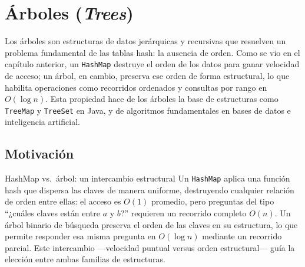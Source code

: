 %
%
%

\chapter{Árboles (\textit{Trees})}
\label{ch:trees}

Los árboles son estructuras de datos jerárquicas y recursivas que resuelven un problema
fundamental de las tablas hash: la ausencia de orden. Como se vio en el capítulo anterior,
un \texttt{HashMap} destruye el orden de los datos para ganar velocidad de acceso; un árbol,
en cambio, preserva ese orden de forma estructural, lo que habilita operaciones como
recorridos ordenados y consultas por rango en $O(\log n)$. Esta propiedad hace de los árboles
la base de estructuras como \texttt{TreeMap} y \texttt{TreeSet} en Java, y de algoritmos
fundamentales en bases de datos e inteligencia artificial.

\section{Motivación}
\label{sec:trees-motivacion}

\begin{observacion}{HashMap vs.\ árbol: un intercambio estructural}
Un \texttt{HashMap} aplica una función hash que dispersa las claves de manera uniforme,
destruyendo cualquier relación de orden entre ellas: el acceso es $O(1)$ promedio, pero
preguntas del tipo ``¿cuáles claves están entre $a$ y $b$?'' requieren un recorrido completo
$O(n)$. Un árbol binario de búsqueda preserva el orden de las claves en su estructura,
lo que permite responder esa misma pregunta en $O(\log n)$ mediante un recorrido parcial.
Este intercambio —velocidad puntual versus orden estructural— guía la elección entre ambas
familias de estructuras.
\end{observacion}

